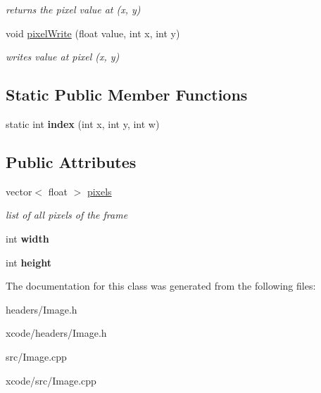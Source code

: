 \begin{DoxyCompactItemize}
\begin{DoxyCompactList}\small\item\em returns the pixel value at (x, y) \end{DoxyCompactList}\item 
\hypertarget{class_image_afcd6f049060759d996f08b335ef2351d}{void \hyperlink{class_image_afcd6f049060759d996f08b335ef2351d}{pixel\-Write} (float value, int x, int y)}\label{class_image_afcd6f049060759d996f08b335ef2351d}

\begin{DoxyCompactList}\small\item\em writes value at pixel (x, y) \end{DoxyCompactList}\end{DoxyCompactItemize}
\subsection*{Static Public Member Functions}
\begin{DoxyCompactItemize}
\item 
\hypertarget{class_image_a990667d3006b26e839421d76cfb8d1d9}{static int {\bfseries index} (int x, int y, int w)}\label{class_image_a990667d3006b26e839421d76cfb8d1d9}

\end{DoxyCompactItemize}
\subsection*{Public Attributes}
\begin{DoxyCompactItemize}
\item 
\hypertarget{class_image_acd0e09aa8465845f1011411c7beb90ac}{vector$<$ float $>$ \hyperlink{class_image_acd0e09aa8465845f1011411c7beb90ac}{pixels}}\label{class_image_acd0e09aa8465845f1011411c7beb90ac}

\begin{DoxyCompactList}\small\item\em list of all pixels of the frame \end{DoxyCompactList}\item 
\hypertarget{class_image_ab8d12f635013c04159cd4d3d972bac88}{int {\bfseries width}}\label{class_image_ab8d12f635013c04159cd4d3d972bac88}

\item 
\hypertarget{class_image_a51df43db420c9c0b57536cb2dd36de5c}{int {\bfseries height}}\label{class_image_a51df43db420c9c0b57536cb2dd36de5c}

\end{DoxyCompactItemize}


The documentation for this class was generated from the following files\-:\begin{DoxyCompactItemize}
\item 
headers/Image.\-h\item 
xcode/headers/Image.\-h\item 
src/Image.\-cpp\item 
xcode/src/Image.\-cpp\end{DoxyCompactItemize}
